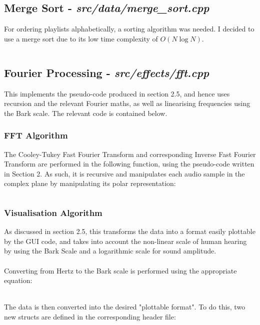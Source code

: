 \pagebreak
\subsection{Merge Sort - \textit{src/data/merge\_sort.cpp}}
For ordering playlists alphabetically, a sorting  algorithm was needed. I decided to use a merge sort due to its low time complexity of \(O(N \log{N})\).
\inputminted[linenos]{c++}{../src/data/merge_sort.cpp}

\pagebreak
\subsection{Fourier Processing - \textit{src/effects/fft.cpp}}
This implements the pseudo-code produced in section 2.5, and hence uses recursion and the relevant Fourier maths, as well as linearising frequencies using the Bark scale. The relevant code is contained below.

\subsubsection{FFT Algorithm}
The Cooley-Tukey Fast Fourier Transform and corresponding Inverse Fast Fourier Transform are performed in the following function, using the pseudo-code written in Section 2. As such, it is recursive and manipulates each audio sample in the complex plane by manipulating its polar representation:
\inputminted[linenos, firstline=49, lastline=81]{c++}{../src/effects/fft.cpp}

\pagebreak
\subsubsection{Visualisation Algorithm}
As discussed in section 2.5, this transforms the data into a format easily plottable by the GUI code, and takes into account the non-linear scale of human hearing by using the Bark Scale and  a logarithmic scale for sound amplitude.

\paragraph{}
Converting from Hertz to the Bark scale is performed using the appropriate equation:
\inputminted[linenos, firstline=150, lastline=156]{c++}{../src/effects/fft.cpp}

\paragraph{}
The data is then converted into the desired "plottable format". To do this, two new structs are defined in the corresponding header file:
\inputminted[linenos, firstline=16, lastline=29]{c++}{../include/effects/fft.h}

